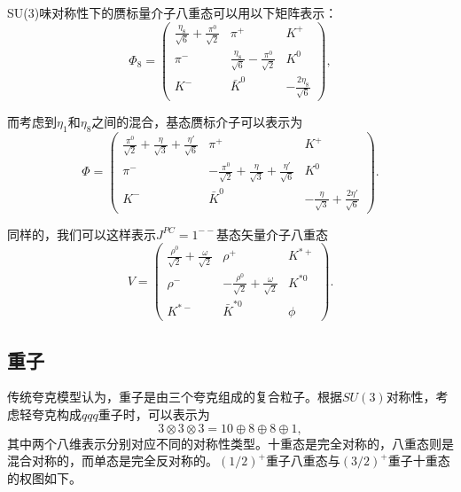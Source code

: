 SU(3)味对称性下的赝标量介子八重态可以用以下矩阵表示：
\begin{equation}
    \Phi_8 = \begin{pmatrix}
    \frac{\eta_8}{\sqrt{6}} + \frac{\pi^0}{\sqrt{2}} & \pi^+ & K^+ \\
    \pi^- & \frac{\eta_8}{\sqrt{6}} - \frac{\pi^0}{\sqrt{2}} & K^0 \\
    K^- & \bar{K}^0 & -\frac{2\eta_8}{\sqrt{6}}
    \end{pmatrix} ,
\end{equation}

而考虑到$\eta_1$和$\eta_8$之间的混合，基态赝标介子可以表示为
\begin{equation}
    \Phi = \begin{pmatrix}
    \frac{\pi^0}{\sqrt{2}} + \frac{\eta}{\sqrt{3}} + \frac{\eta'}{\sqrt{6}} & \pi^+ & K^+ \\
    \pi^- & -\frac{\pi^0}{\sqrt{2}} + \frac{\eta}{\sqrt{3}} + \frac{\eta'}{\sqrt{6}} & K^0 \\
    K^- & \bar{K}^0 & -\frac{\eta}{\sqrt{3}} + \frac{2\eta'}{\sqrt{6}}
    \end{pmatrix} .
\end{equation}

同样的，我们可以这样表示$J^{PC} = 1^{--}$基态矢量介子八重态
\begin{equation}
    V = \begin{pmatrix}
    \frac{\rho^0}{\sqrt{2}} + \frac{\omega}{\sqrt{2}} & \rho^+ & K^{*+} \\
    \rho^- & -\frac{\rho^0}{\sqrt{2}} + \frac{\omega}{\sqrt{2}} & K^{*0} \\
    K^{*-} & \bar{K}^{*0} & \phi
    \end{pmatrix} .
\end{equation}

\subsection{重子}
传统夸克模型认为，重子是由三个夸克组成的复合粒子。根据$SU(3)$对称性，考虑轻夸克构成$qqq$重子时，可以表示为
\begin{equation}
    3 \otimes 3 \otimes 3 = 10 \oplus 8 \oplus 8 \oplus 1 ,
\end{equation}
其中两个八维表示分别对应不同的对称性类型。十重态是完全对称的，八重态则是混合对称的，而单态是完全反对称的。$(1/2)^+$重子八重态与$(3/2)^+$重子十重态的权图如下。\\
\

